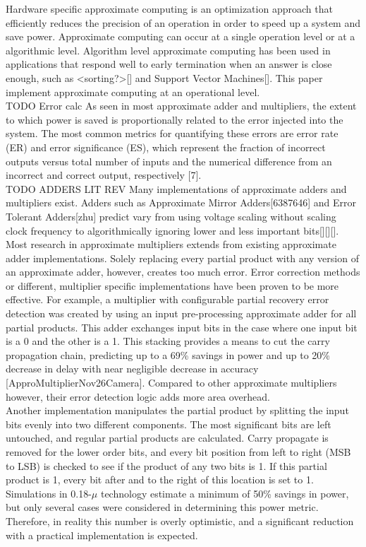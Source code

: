 \documentclass[conference]{IEEEtran}
\begin{document}
	\indent Hardware specific approximate computing is an optimization approach that efficiently reduces the precision of an operation in order to speed up a system and save power. Approximate computing can occur at a single operation level or at a algorithmic level. Algorithm level approximate computing has been used in applications that respond well to early termination when an answer is close enough, such as <sorting?>[] and Support Vector Machines[]. This paper implement approximate computing at an operational level.\\
	TODO Error calc
	\indent 	As seen in most approximate adder and multipliers, the extent to which power is saved is proportionally related to the error injected into the system. The most common metrics for quantifying these errors are error rate (ER) and error significance (ES), which represent the fraction of incorrect outputs versus total number of inputs and the numerical difference from an incorrect and correct output, respectively [7]. \\
	TODO ADDERS LIT REV
	\indent Many implementations of approximate adders and multipliers exist. Adders such as Approximate Mirror Adders[6387646] and Error Tolerant Adders[zhu] predict  vary from using voltage scaling without scaling clock frequency to algorithmically ignoring lower and less important bits[][][]. \\
	
	\indent Most research in approximate multipliers extends from existing approximate adder implementations. Solely replacing every partial product with any version of an approximate adder, however, creates too much error. Error correction methods or different, multiplier specific implementations have been proven to be more effective. For example, a multiplier with configurable partial recovery error detection was created by using an input pre-processing approximate adder for all partial products. This adder exchanges input bits in the case where one input bit is a 0 and the other is a 1. This stacking provides a means to cut the carry propagation chain, predicting up to a 69\% savings in power and up to 20\% decrease in delay with near negligible decrease in accuracy  [ApproMultiplierNov26Camera]. Compared to other approximate multipliers however, their error detection logic adds more area overhead.\\
	
	\indent Another implementation manipulates the partial product by splitting the input bits evenly into two different components. The most significant bits are left untouched, and regular partial products are calculated. Carry propagate is removed for the lower order bits, and every bit position from left to right (MSB to LSB) is checked to see if the product of any two bits is 1. If this partial product is 1, every bit after and to the right of this location is set to 1. Simulations in 0.18-$\mu$ technology estimate a minimum of 50\% savings in power, but only several cases were considered in determining this power metric. Therefore, in reality this number is overly optimistic, and a significant reduction with a practical implementation is expected. \\
	
\end{document}
